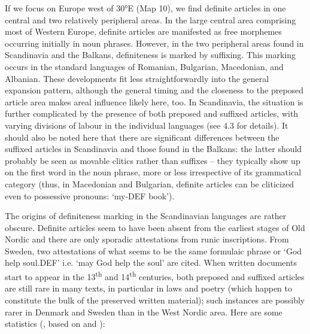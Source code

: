 
If we focus on Europe west of 30°E (Map 10), we find definite articles in one central and two relatively peripheral areas. In the large central area comprising most of Western Europe, definite articles are manifested as free morphemes occurring initially in noun phrases. However, in the two peripheral areas found in Scandinavia and the Balkans, definiteness is marked by suffixing.  This marking occurs in the standard languages of Romanian, Bulgarian, Macedonian, and Albanian. These developments fit less straightforwardly into the general expansion pattern, although the general timing and the closeness to the preposed article area makes areal influence likely here, too. In Scandinavia, the situation is further complicated by the presence of both preposed and suffixed articles, with varying divisions of labour in the individual languages (see 4.3 for details). It should also be noted here that there are significant differences between the suffixed articles in Scandinavia and those found in the Balkans: the latter should probably be seen as movable clitics rather than suffixes – they typically show up on the first word in the noun phrase, more or less irrespective of its grammatical category (thus, in Macedonian and Bulgarian, definite articles can be cliticized even to possessive pronouns:  ‘my-DEF book’). 


The origins of definiteness marking in the Scandinavian languages are rather obscure. Definite articles seem to have been absent from the earliest stages of Old Nordic and there are only sporadic attestations from runic inscriptions. From Sweden, two attestations of what seems to be the same formulaic phrase or ‘God help soul.DEF’ i.e. ‘may God help the soul’ are cited. When written documents start to appear in the 13\textsuperscript{th} and 14\textsuperscript{th} centuries, both preposed and suffixed articles are still rare in many texts, in particular in laws and poetry (which happen to constitute the bulk of the preserved written material); such instances are possibly rarer in Denmark and Sweden than in the West Nordic area. Here are some statistics (\citet[938]{Delsing2002}, based on \citet{Larm1936} and \citet{Skautrup1944}): 

